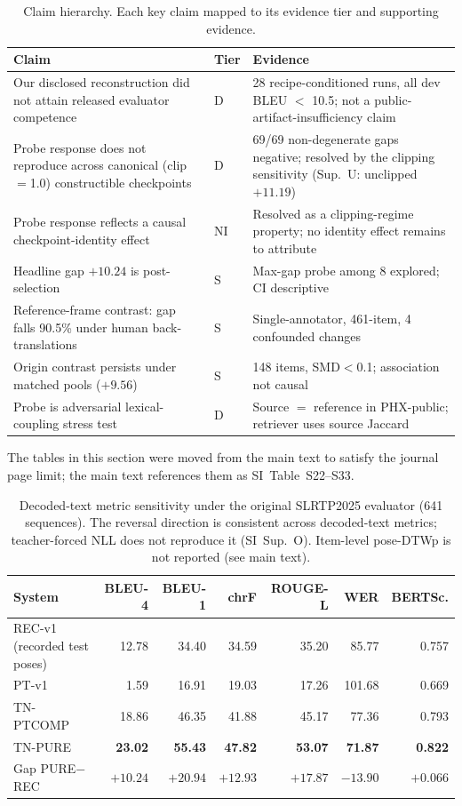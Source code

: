 \documentclass[pdflatex,sn-chicago]{sn-jnl}
\begin{document}
\begin{table}[h]
\centering
\scriptsize\setlength{\tabcolsep}{3pt}
\caption{Claim hierarchy. Each key claim mapped to its evidence tier and supporting evidence.}
\label{tab:claim_hierarchy}
\begin{tabular}{p{3.5cm}p{1.0cm}p{5.0cm}}
\toprule
Claim & Tier & Evidence \\
\midrule
Our disclosed reconstruction did not attain released evaluator competence & D & 28 recipe-conditioned runs, all dev BLEU $<$ 10.5; not a public-artifact-insufficiency claim \\
Probe response does not reproduce across canonical (clip$=$1.0) constructible checkpoints & D & 69/69 non-degenerate gaps negative; resolved by the clipping sensitivity (Sup.~U: unclipped $+11.19$) \\
Probe response reflects a causal checkpoint-identity effect & NI & Resolved as a clipping-regime property; no identity effect remains to attribute \\
Headline gap $+10.24$ is post-selection & S & Max-gap probe among 8 explored; CI descriptive \\
Reference-frame contrast: gap falls 90.5\% under human back-translations & S & Single-annotator, 461-item, 4 confounded changes \\
Origin contrast persists under matched pools ($+9.56$) & S & 148 items, SMD$<$0.1; association not causal \\
Probe is adversarial lexical-coupling stress test & D & Source $=$ reference in PHX-public; retriever uses source Jaccard \\
\bottomrule
\end{tabular}
\end{table}
The tables in this section were moved from the main text to satisfy the journal page limit; the main text references them as SI~Table~S22--S33.

\begin{table}[h]
\centering
\scriptsize\setlength{\tabcolsep}{3pt}
\caption{Decoded-text metric sensitivity under the original SLRTP2025 evaluator (641 sequences). The reversal direction is consistent across decoded-text metrics; teacher-forced NLL does not reproduce it (SI~Sup.~O). Item-level pose-DTWp is not reported (see main text).}
\label{tab:s1_metric_sensitivity}
\begin{tabular}{lrrrrrr}
\toprule
System & BLEU-4 & BLEU-1 & chrF & ROUGE-L & WER & BERTSc. \\
\midrule
REC-v1 (recorded test poses) & 12.78 & 34.40 & 34.59 & 35.20 & 85.77 & 0.757 \\
PT-v1         & 1.59 & 16.91 & 19.03 & 17.26 & 101.68 & 0.669 \\
TN-PTCOMP  & 18.86 & 46.35 & 41.88 & 45.17 & 77.36 & 0.793 \\
TN-PURE    & \textbf{23.02} & \textbf{55.43} & \textbf{47.82} & \textbf{53.07} & \textbf{71.87} & \textbf{0.822} \\
\midrule
Gap PURE$-$REC & $+10.24$ & $+20.94$ & $+12.93$ & $+17.87$ & $-13.90$ & $+0.066$ \\
\bottomrule
\end{tabular}
\end{table}
\end{document}

